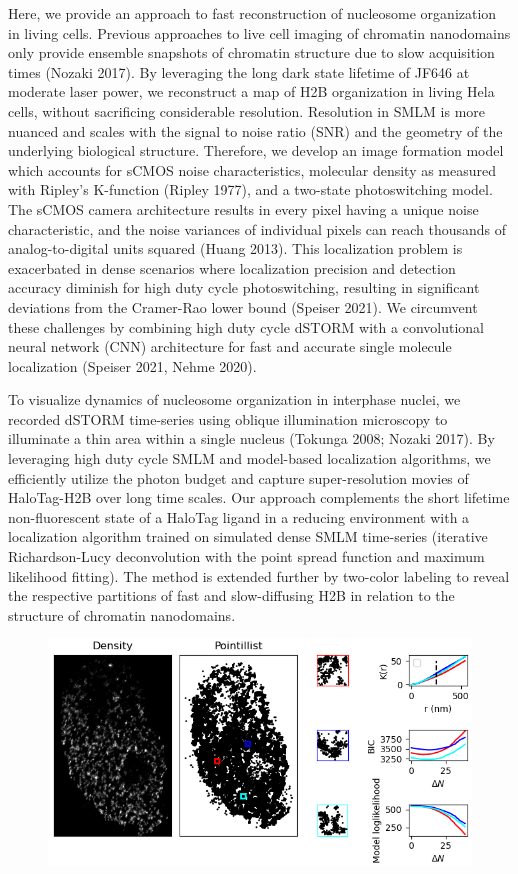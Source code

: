 \documentclass{ucetd}
\begin{document}
Here, we provide an approach to fast reconstruction of nucleosome organization in living cells. Previous approaches to live cell imaging of chromatin nanodomains only provide ensemble snapshots of chromatin structure due to slow acquisition times (Nozaki 2017). By leveraging the long dark state lifetime of JF646 at moderate laser power, we reconstruct a map of H2B organization in living Hela cells, without sacrificing considerable resolution. Resolution in SMLM is more nuanced and scales with the signal to noise ratio (SNR) and the geometry of the underlying biological structure. Therefore, we develop an image formation model which accounts for sCMOS noise characteristics, molecular density as measured with Ripley’s K-function (Ripley 1977), and a two-state photoswitching model. The sCMOS camera architecture results in every pixel having a unique noise characteristic, and the noise variances of individual pixels can reach thousands of analog-to-digital units squared (Huang 2013). This localization problem is exacerbated in dense scenarios where localization precision and detection accuracy diminish for high duty cycle photoswitching, resulting in significant deviations from the Cramer-Rao lower bound (Speiser 2021). We circumvent these challenges by combining high duty cycle dSTORM with a convolutional neural network (CNN) architecture for fast and accurate single molecule localization (Speiser 2021, Nehme 2020). 

To visualize dynamics of nucleosome organization in interphase nuclei, we recorded dSTORM time-series using oblique illumination microscopy to illuminate a thin area within a single nucleus (Tokunga 2008; Nozaki 2017). By leveraging high duty cycle SMLM and model-based localization algorithms, we efficiently utilize the photon budget and capture super-resolution movies of HaloTag-H2B over long time scales. Our approach complements the short lifetime non-fluorescent state of a HaloTag ligand in a reducing environment with a localization algorithm trained on simulated dense SMLM time-series (iterative Richardson-Lucy deconvolution with the point spread function and maximum likelihood fitting). The method is extended further by two-color labeling to reveal the respective partitions of fast and slow-diffusing H2B in relation to the structure of chromatin nanodomains.  


\begin{figure}
\begin{center}
\includegraphics[width=16cm]{Cluster.png}
\end{center}
\end{figure}
\end{document}
